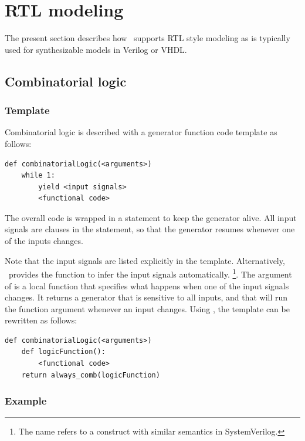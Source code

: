 \section{RTL modeling \label{model-rtl}}

The present section describes how \myhdl\ supports RTL style modeling
as is typically used for synthesizable models in Verilog or VHDL. 

\subsection{Combinatorial logic \label{model-comb}}

\subsubsection{Template \label{model-comb-templ}}
 
Combinatorial logic is described with a generator function code template as
follows: 

\begin{verbatim}
def combinatorialLogic(<arguments>)
    while 1:
        yield <input signals>
        <functional code>
\end{verbatim}

The overall code is wrapped in a  statement to keep the
generator alive. All input signals are clauses in the 
statement, so that the generator resumes whenever one of the inputs
changes.

Note that the input signals are listed explicitly in the
template. Alternatively, \myhdl\ provides the 
function to infer the input signals automatically. 
\footnote{The name  refers to
a construct with similar semantics in SystemVerilog.}.
The argument of
 is a local function that specifies
what happens when one of the input signals
changes. It returns a generator that is
sensitive to all inputs, and that will run the function argument
whenever an input changes. Using , the template
can be rewritten as follows:

\begin{verbatim}
def combinatorialLogic(<arguments>)
    def logicFunction():
        <functional code>
    return always_comb(logicFunction)
\end{verbatim}


\subsubsection{Example \label{model-comb-ex}}


